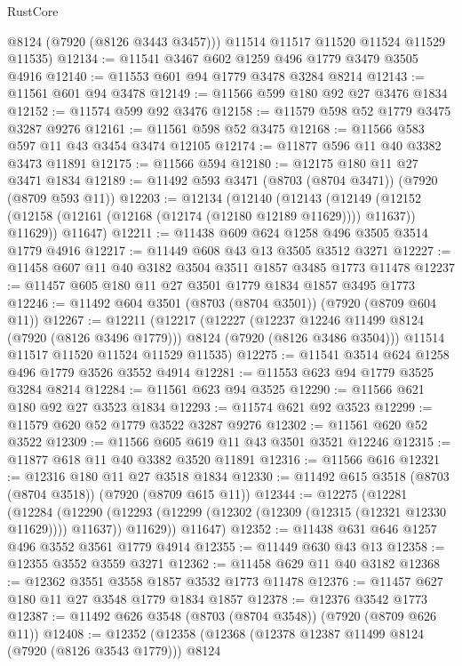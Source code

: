 \begin{lexlean}{RustCore}
\begin{coremodule}
        @8124
        (@7920 (@8126 @3443 @3457)))
      @11514
      @11517
      @11520
      @11524
      @11529
      @11535)
@12134 := @11541 @3467 @602 @1259 @496 @1779 @3479 @3505 @4916
@12140 := @11553 @601 @94 @1779 @3478 @3284 @8214
@12143 := @11561 @601 @94 @3478
@12149 := @11566 @599 @180 @92 @27 @3476 @1834
@12152 := @11574 @599 @92 @3476
@12158 := @11579 @598 @52 @1779 @3475 @3287 @9276
@12161 := @11561 @598 @52 @3475
@12168 := @11566 @583 @597 @11 @43 @3454 @3474 @12105
@12174 := @11877 @596 @11 @40 @3382 @3473 @11891
@12175 := @11566 @594
@12180 := @12175 @180 @11 @27 @3471 @1834
@12189 := @11492 @593 @3471 (@8703 (@8704 @3471)) (@7920 (@8709 @593 @11))
@12203 := @12134
    (@12140
      (@12143
        (@12149 (@12152 (@12158 (@12161 (@12168 (@12174 (@12180 @12189 @11629)))) @11637)) @11629))
      @11647)
@12211 := @11438 @609 @624 @1258 @496 @3505 @3514 @1779 @4916
@12217 := @11449 @608 @43 @13 @3505 @3512 @3271
@12227 := @11458 @607 @11 @40 @3182 @3504 @3511 @1857 @3485 @1773 @11478
@12237 := @11457 @605 @180 @11 @27 @3501 @1779 @1834 @1857 @3495 @1773
@12246 := @11492 @604 @3501 (@8703 (@8704 @3501)) (@7920 (@8709 @604 @11))
@12267 := @12211
    (@12217
      (@12227
        (@12237 @12246 @11499 @8124 (@7920 (@8126 @3496 @1779)))
        @8124
        (@7920 (@8126 @3486 @3504)))
      @11514
      @11517
      @11520
      @11524
      @11529
      @11535)
@12275 := @11541 @3514 @624 @1258 @496 @1779 @3526 @3552 @4914
@12281 := @11553 @623 @94 @1779 @3525 @3284 @8214
@12284 := @11561 @623 @94 @3525
@12290 := @11566 @621 @180 @92 @27 @3523 @1834
@12293 := @11574 @621 @92 @3523
@12299 := @11579 @620 @52 @1779 @3522 @3287 @9276
@12302 := @11561 @620 @52 @3522
@12309 := @11566 @605 @619 @11 @43 @3501 @3521 @12246
@12315 := @11877 @618 @11 @40 @3382 @3520 @11891
@12316 := @11566 @616
@12321 := @12316 @180 @11 @27 @3518 @1834
@12330 := @11492 @615 @3518 (@8703 (@8704 @3518)) (@7920 (@8709 @615 @11))
@12344 := @12275
    (@12281
      (@12284
        (@12290 (@12293 (@12299 (@12302 (@12309 (@12315 (@12321 @12330 @11629)))) @11637)) @11629))
      @11647)
@12352 := @11438 @631 @646 @1257 @496 @3552 @3561 @1779 @4914
@12355 := @11449 @630 @43 @13
@12358 := @12355 @3552 @3559 @3271
@12362 := @11458 @629 @11 @40 @3182
@12368 := @12362 @3551 @3558 @1857 @3532 @1773 @11478
@12376 := @11457 @627 @180 @11 @27 @3548 @1779 @1834 @1857
@12378 := @12376 @3542 @1773
@12387 := @11492 @626 @3548 (@8703 (@8704 @3548)) (@7920 (@8709 @626 @11))
@12408 := @12352
    (@12358
      (@12368
        (@12378 @12387 @11499 @8124 (@7920 (@8126 @3543 @1779)))
        @8124

\end{coremodule}
\end{lexlean}
